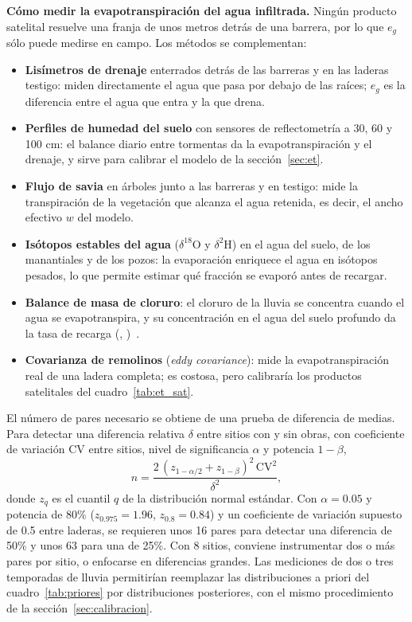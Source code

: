 \documentclass[11pt,letterpaper]{article}
\makeatletter
\newcommand{\citap}[1]{(\@nameuse{cautor@#1}, \@nameuse{canio@#1})~\cite{#1}}
\makeatother
\begin{document}
\textbf{Cómo medir la evapotranspiración del agua infiltrada.} Ningún producto satelital resuelve una franja de unos metros detrás de una barrera, por lo que $e_g$ sólo puede medirse en campo. Los métodos se complementan:
\begin{itemize}
  \item \textbf{Lisímetros de drenaje} enterrados detrás de las barreras y en las laderas testigo: miden directamente el agua que pasa por debajo de las raíces; $e_g$ es la diferencia entre el agua que entra y la que drena.
  \item \textbf{Perfiles de humedad del suelo} con sensores de reflectometría a 30, 60 y 100 cm: el balance diario entre tormentas da la evapotranspiración y el drenaje, y sirve para calibrar el modelo de la sección~\ref{sec:et}.
  \item \textbf{Flujo de savia} en árboles junto a las barreras y en testigo: mide la transpiración de la vegetación que alcanza el agua retenida, es decir, el ancho efectivo $w$ del modelo.
  \item \textbf{Isótopos estables del agua} ($\delta^{18}$O y $\delta^2$H) en el agua del suelo, de los manantiales y de los pozos: la evaporación enriquece el agua en isótopos pesados, lo que permite estimar qué fracción se evaporó antes de recargar.
  \item \textbf{Balance de masa de cloruro}: el cloruro de la lluvia se concentra cuando el agua se evapotranspira, y su concentración en el agua del suelo profundo da la tasa de recarga \citap{scanlon2006}.
  \item \textbf{Covarianza de remolinos} (\emph{eddy covariance}): mide la evapotranspiración real de una ladera completa; es costosa, pero calibraría los productos satelitales del cuadro~\ref{tab:et_sat}.
\end{itemize}

El número de pares necesario se obtiene de una prueba de diferencia de medias. Para detectar una diferencia relativa $\delta$ entre sitios con y sin obras, con coeficiente de variación $\text{CV}$ entre sitios, nivel de significancia $\alpha$ y potencia $1-\beta$,
\begin{equation}
n=\frac{2\,(z_{1-\alpha/2}+z_{1-\beta})^2\,\text{CV}^2}{\delta^2},
\end{equation}
donde $z_q$ es el cuantil $q$ de la distribución normal estándar. Con $\alpha=0.05$ y potencia de 80\% ($z_{0.975}=1.96$, $z_{0.8}=0.84$) y un coeficiente de variación supuesto de 0.5 entre laderas, se requieren unos 16 pares para detectar una diferencia de 50\% y unos 63 para una de 25\%. Con 8 sitios, conviene instrumentar dos o más pares por sitio, o enfocarse en diferencias grandes. Las mediciones de dos o tres temporadas de lluvia permitirían reemplazar las distribuciones a priori del cuadro~\ref{tab:priores} por distribuciones posteriores, con el mismo procedimiento de la sección~\ref{sec:calibracion}.
\end{document}

